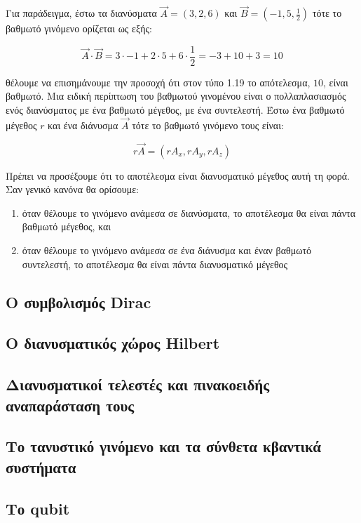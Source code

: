 Για παράδειγμα, έστω τα διανύσματα $\vec{A} = (3, 2, 6)$ και $\vec{B} = (-1, 5, \frac{1}{2})$ τότε το βαθμωτό γινόμενο
ορίζεται ως εξής:

\begin{equation}
    \vec{A} \cdot \vec{B} = 3 \cdot -1 + 2 \cdot 5 + 6 \cdot \frac{1}{2} = -3 + 10 + 3 = 10
\end{equation}

θέλουμε να επισημάνουμε την προσοχή ότι στον τύπο 1.19 το απότελεσμα, $10$, είναι βαθμωτό. Μια ειδική περίπτωση του
βαθμωτού γινομένου είναι ο πολλαπλασιασμός ενός διανύσματος με ένα βαθμωτό μέγεθος, με ένα συντελεστή. Έστω ένα βαθμωτό
μέγεθος $r$ και ένα διάνυσμα $\vec{A}$ τότε το βαθμωτό γινόμενο τους είναι:

\begin{equation}
    r\vec{A}  = (rA_x, rA_y, rA_z)
\end{equation}

Πρέπει να προσέξουμε ότι το αποτέλεσμα είναι διανυσματικό μέγεθος αυτή τη φορά. Σαν γενικό κανόνα θα ορίσουμε:

\begin{enumerate}
    \item όταν θέλουμε το γινόμενο ανάμεσα σε διανύσματα, το αποτέλεσμα θα είναι πάντα βαθμωτό μέγεθος, και
    \item όταν θέλουμε το γινόμενο ανάμεσα σε ένα διάνυσμα και έναν βαθμωτό συντελεστή, το αποτέλεσμα θα είναι πάντα διανυσματικό μέγεθος
\end{enumerate}

\subsection{Ο συμβολισμός Dirac}
\subsection{Ο διανυσματικός χώρος Hilbert}
\subsection{Διανυσματικοί τελεστές και πινακοειδής αναπαράσταση τους}
\subsection{Το τανυστικό γινόμενο και τα σύνθετα κβαντικά συστήματα}
\subsection{Το qubit}
